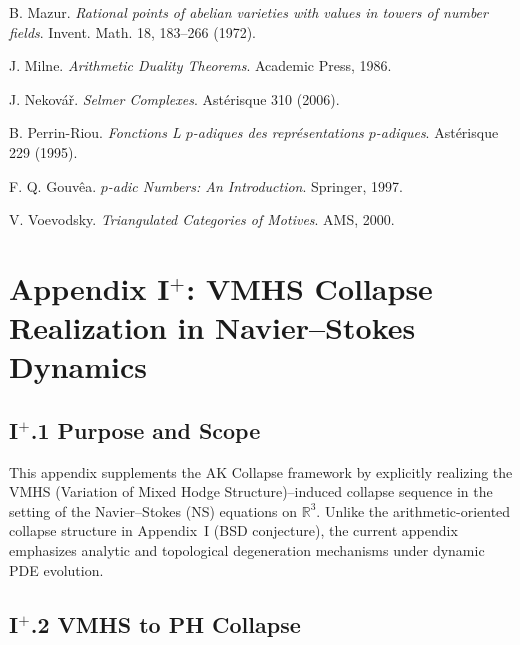 \documentclass[11pt]{article}
\begin{document}
\begin{thebibliography}{9}

B. Mazur.  
\textit{Rational points of abelian varieties with values in towers of number fields}.  
Invent. Math. 18, 183–266 (1972).

J. Milne.  
\textit{Arithmetic Duality Theorems}. Academic Press, 1986.

J. Nekovář.  
\textit{Selmer Complexes}. Astérisque 310 (2006).

B. Perrin-Riou.  
\textit{Fonctions L $p$-adiques des représentations $p$-adiques}. Astérisque 229 (1995).

F. Q. Gouvêa.  
\textit{$p$-adic Numbers: An Introduction}. Springer, 1997.

V. Voevodsky.  
\textit{Triangulated Categories of Motives}. AMS, 2000.

\end{thebibliography}




\section*{Appendix I$^+$: VMHS Collapse Realization in Navier--Stokes Dynamics}

\subsection*{I$^+$.1 Purpose and Scope}

This appendix supplements the AK Collapse framework by explicitly realizing  
the VMHS (Variation of Mixed Hodge Structure)–induced collapse sequence  
in the setting of the Navier--Stokes (NS) equations on \( \mathbb{R}^3 \).  
Unlike the arithmetic-oriented collapse structure in Appendix~I (BSD conjecture),  
the current appendix emphasizes analytic and topological degeneration mechanisms  
under dynamic PDE evolution.

\subsection*{I$^+$.2 VMHS to PH Collapse}
\end{document}
